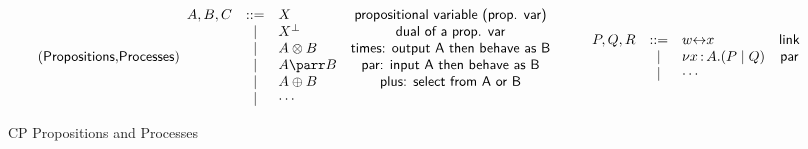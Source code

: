 \begin{figure*}
\begin{gather*}
  \tag{\key{Propositions},\key{Processes}}
  \begin{array}{rclc}
    A,B,C & \bnf & X & \key{propositional variable (prop. var)}\\
          & \alt & \dualbt{X} & \key{dual of a prop. var}\\
          & \alt & A \otimes B & \key{times: output A then behave as B}\\
          & \alt & A \parr B & \key{par: input A then behave as B}\\
          & \alt & A \oplus B & \key{plus: select from A or B}\\
          & \alt & \cdots &
  \end{array}
  \qquad
  \begin{array}{rclc}
    P,Q,R & \bnf & w \link x & \key{link}\\
          & \alt & \nu x \of{A}.(P \mid Q) & \key{par}\\
          & \alt & \cdots &
  \end{array}
\end{gather*}
\caption{CP Propositions and Processes}
\label{fig:cptnts}
\end{figure*}
